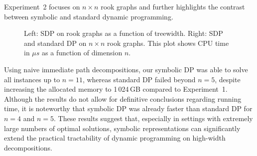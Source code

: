 Experiment~2 focuses on $n \times n$ rook graphs and further highlights the
contrast between symbolic and standard dynamic programming. 

\begin{figure}[h]
    \begin{subfigure}{0.48\textwidth}
        \centering
         \resizebox{\textwidth}{!}{}
        \label{fig:rookbytreewidth}
    \end{subfigure}
    \hfill
    \begin{subfigure}{0.48\textwidth}       
    \centering
    \resizebox{\textwidth}{!}{}
        \label{fig:rookbysize}
    \end{subfigure}
    \caption{Left: SDP on rook graphs as a function of treewidth. Right: SDP and standard DP on $n \times n$ rook graphs. This plot shows CPU time in $\mu s$ as a function of dimension $n$.   \label{fig:RookComparison}}
   
\end{figure}

Using naive
immediate path decompositions, our symbolic DP was able to solve all instances
up to $n=11$, whereas standard DP failed beyond $n=5$, despite increasing the
allocated memory to 1\,024\,GB compared to Experiment~1. Although the results do
not allow for definitive conclusions regarding running time, it is noteworthy
that symbolic DP was already faster than standard DP for $n=4$ and $n=5$. These
results suggest that, especially in settings with extremely large numbers of optimal
solutions, symbolic representations can significantly extend the practical
tractability of dynamic programming on high-width decompositions.



   
